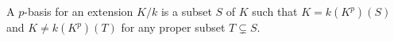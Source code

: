 A $p$-basis for an extension $K/k$ is a subset $S$ of $K$ such that $K = k(K^p)(S)$ and $K \neq k(K^p)(T)$ for any proper subset $T \subsetneq S$.
